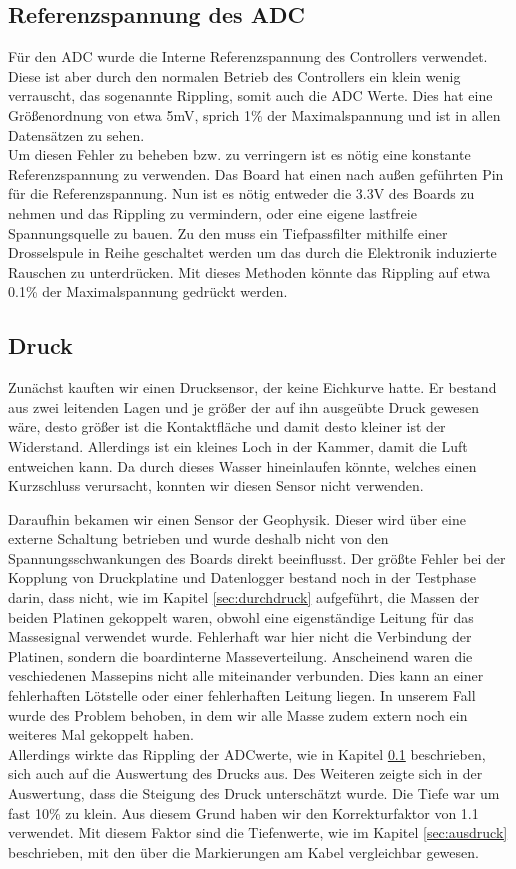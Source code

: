 \documentclass[12pt,a4paper,titlepage,headinclude,bibtotoc]{scrartcl}
\numberwithin{equation}{subsection}
\begin{document}
\subsection{Referenzspannung des ADC}
\label{sec:diskreffADC}
Für den ADC wurde die Interne Referenzspannung des Controllers verwendet.
Diese ist aber durch den normalen Betrieb des Controllers ein klein wenig verrauscht, das sogenannte Rippling, somit auch die ADC Werte.
Dies hat eine Größenordnung von etwa 5\si{\milli\volt}, sprich 1\% der Maximalspannung und ist in allen Datensätzen zu sehen.\\
Um diesen Fehler zu beheben bzw. zu verringern ist es nötig eine konstante Referenzspannung zu verwenden.
Das Board hat einen nach außen geführten Pin für die Referenzspannung.
Nun ist es nötig entweder die 3.3\si{\volt} des Boards zu nehmen und das Rippling zu vermindern, oder eine eigene lastfreie Spannungsquelle zu bauen.
Zu den muss ein Tiefpassfilter mithilfe einer Drosselspule in Reihe geschaltet werden um das durch die Elektronik induzierte Rauschen zu unterdrücken.
Mit dieses Methoden könnte das Rippling auf etwa 0.1\% der Maximalspannung gedrückt werden.

\subsection{Druck}
Zunächst kauften wir einen Drucksensor, der keine Eichkurve hatte.
Er bestand aus zwei leitenden Lagen und je größer der auf ihn ausgeübte Druck gewesen wäre, desto größer ist die Kontaktfläche und damit desto kleiner ist der Widerstand.
Allerdings ist ein kleines Loch in der Kammer, damit die Luft entweichen kann.
Da durch dieses Wasser hineinlaufen könnte, welches einen Kurzschluss verursacht, konnten wir diesen Sensor nicht verwenden.

Daraufhin bekamen wir einen Sensor der Geophysik.
Dieser wird über eine externe Schaltung betrieben und wurde deshalb nicht von den Spannungsschwankungen des Boards direkt beeinflusst.
Der größte Fehler bei der Kopplung von Druckplatine und Datenlogger bestand noch in der Testphase darin, dass nicht, wie im Kapitel \ref{sec:durchdruck} aufgeführt, die Massen der beiden Platinen gekoppelt waren, obwohl eine eigenständige Leitung für das Massesignal verwendet wurde.
Fehlerhaft war hier nicht die Verbindung der Platinen, sondern die boardinterne Masseverteilung.
Anscheinend waren die veschiedenen Massepins nicht alle miteinander verbunden.
Dies kann an einer fehlerhaften Lötstelle oder einer fehlerhaften Leitung liegen.
In unserem Fall wurde des Problem behoben, in dem wir alle Masse zudem extern noch ein weiteres Mal gekoppelt haben.\\
Allerdings wirkte das Rippling der ADCwerte, wie in Kapitel \ref{sec:diskreffADC} beschrieben, sich auch auf die Auswertung des Drucks aus.
Des Weiteren zeigte sich in der Auswertung, dass die Steigung des Druck unterschätzt wurde.
Die Tiefe war um fast 10\% zu klein.
Aus diesem Grund haben wir den Korrekturfaktor von 1.1 verwendet.
Mit diesem Faktor sind die Tiefenwerte, wie im Kapitel \ref{sec:ausdruck} beschrieben, mit den über die Markierungen am Kabel vergleichbar gewesen.
\end{document}
